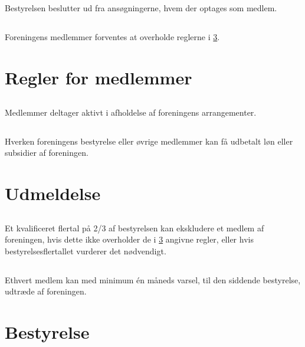 \documentclass[danish,a4paper,twocolumn,oneside,article]{memoir}
\begin{document}
\section{} Bestyrelsen beslutter ud fra ansøgningerne, hvem der optages som medlem.

\section{} Foreningens medlemmer forventes at overholde reglerne i \ref{p:rules}.

\chapter{Regler for medlemmer}\label{p:rules}

\section{}\label{s:active} Medlemmer deltager aktivt i afholdelse af foreningens arrangementer.

\section{} Hverken foreningens bestyrelse eller øvrige medlemmer kan få udbetalt løn eller
subsidier af foreningen.


\chapter{Udmeldelse}

\section{} Et kvalificeret flertal på 2/3 af bestyrelsen kan ekskludere et medlem af foreningen, hvis 
dette ikke overholder de i \ref{p:rules} angivne regler, eller hvis bestyrelsesflertallet vurderer det nødvendigt.

\section{} Ethvert medlem kan med minimum én måneds varsel, til den siddende bestyrelse, udtræde af foreningen.


\chapter{Bestyrelse}
\end{document}
